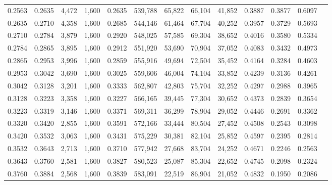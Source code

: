 \begin{tabular}{rrrrrrrrrrrrr}
0.2563 & 0.2635 &  4,472 & 1,600 &                                     0.2635 & 539,788 &  65,822 &  66,104 &  41,852 & 0.3887 & 0.3877 & 0.6097 \\
0.2635 & 0.2710 &  4,358 & 1,600 &                                     0.2685 & 544,146 &  61,464 &  67,704 &  40,252 & 0.3957 & 0.3729 & 0.5693 \\
0.2710 & 0.2784 &  3,879 & 1,600 &                                     0.2920 & 548,025 &  57,585 &  69,304 &  38,652 & 0.4016 & 0.3580 & 0.5334 \\
0.2784 & 0.2865 &  3,895 & 1,600 &                                     0.2912 & 551,920 &  53,690 &  70,904 &  37,052 & 0.4083 & 0.3432 & 0.4973 \\
0.2865 & 0.2953 &  3,996 & 1,600 &                                     0.2859 & 555,916 &  49,694 &  72,504 &  35,452 & 0.4164 & 0.3284 & 0.4603 \\
0.2953 & 0.3042 &  3,690 & 1,600 &                                     0.3025 & 559,606 &  46,004 &  74,104 &  33,852 & 0.4239 & 0.3136 & 0.4261 \\
0.3042 & 0.3128 &  3,201 & 1,600 &                                     0.3333 & 562,807 &  42,803 &  75,704 &  32,252 & 0.4297 & 0.2988 & 0.3965 \\
0.3128 & 0.3223 &  3,358 & 1,600 &                                     0.3227 & 566,165 &  39,445 &  77,304 &  30,652 & 0.4373 & 0.2839 & 0.3654 \\
0.3223 & 0.3319 &  3,146 & 1,600 &                                     0.3371 & 569,311 &  36,299 &  78,904 &  29,052 & 0.4446 & 0.2691 & 0.3362 \\
0.3320 & 0.3420 &  2,855 & 1,600 &                                     0.3591 & 572,166 &  33,444 &  80,504 &  27,452 & 0.4508 & 0.2543 & 0.3098 \\
0.3420 & 0.3532 &  3,063 & 1,600 &                                     0.3431 & 575,229 &  30,381 &  82,104 &  25,852 & 0.4597 & 0.2395 & 0.2814 \\
0.3532 & 0.3643 &  2,713 & 1,600 &                                     0.3710 & 577,942 &  27,668 &  83,704 &  24,252 & 0.4671 & 0.2246 & 0.2563 \\
0.3643 & 0.3760 &  2,581 & 1,600 &                                     0.3827 & 580,523 &  25,087 &  85,304 &  22,652 & 0.4745 & 0.2098 & 0.2324 \\
0.3760 & 0.3884 &  2,568 & 1,600 &                                     0.3839 & 583,091 &  22,519 &  86,904 &  21,052 & 0.4832 & 0.1950 & 0.2086 \\

\end{tabular}
